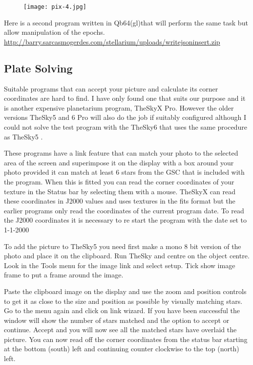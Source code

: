 \begin{figure}[h]
\centering\texttt{[image: pix-4.jpg]}
\end{figure}

Here is a second program written in Qb64(gl)that will perform the same
task but allow manipulation of the epochs.
\url{http://barry.sarcasmogerdes.com/stellarium/uploads/writejsoninsert.zip}

\subsection{Plate Solving}\label{plate-solving}

Suitable programs that can accept your picture and calculate its corner
coordinates are hard to find. I have only found one that suits our
purpose and it is another expensive planetarium program, TheSkyX Pro.
However the older versions TheSky5 and 6 Pro will also do the job if
suitably configured although I could not solve the test program with the
TheSky6 that uses the same procedure as TheSky5 .

These programs have a link feature that can match your photo to the
selected area of the screen and superimpose it on the display with a box
around your photo provided it can match at least 6 stars from the GSC
that is included with the program. When this is fitted you can read the
corner coordinates of your texture in the Status bar by selecting them
with a mouse. TheSkyX can read these coordinates in J2000 values and
uses textures in the fits format but the earlier programs only read the
coordinates of the current program date. To read the J2000 coordinates
it is necessary to re start the program with the date set to 1-1-2000

To add the picture to TheSky5 you need first make a mono 8 bit version
of the photo and place it on the clipboard. Run TheSky and centre on the
object centre. Look in the Tools menu for the image link and select
setup. Tick show image frame to put a frame around the image.

Paste the clipboard image on the display and use the zoom and position
controls to get it as close to the size and position as possible by
visually matching stars. Go to the menu again and click on link wizard.
If you have been successful the window will show the number of stars
matched and the option to accept or continue. Accept and you will now
see all the matched stars have overlaid the picture. You can now read
off the corner coordinates from the status bar starting at the bottom
(south) left and continuing counter clockwise to the top (north) left.

